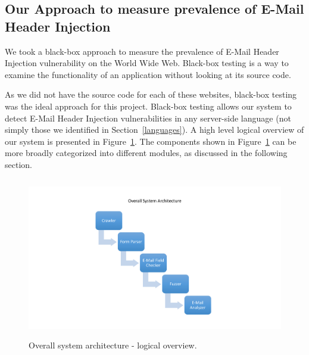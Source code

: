 \subsection[Approach]{Our Approach to measure prevalence of E-Mail Header Injection}
\label{sys:appr}
We took a black-box approach to measure the prevalence of E-Mail Header Injection vulnerability on the World Wide Web. Black-box testing \cite{wiki:Black-box_testing} is a way to examine the functionality of an application without looking at its source code.

As we did not have the source code for each of these websites, black-box testing was the ideal approach for this project. Black-box testing allows our system to detect E-Mail Header Injection vulnerabilities in any server-side language (not simply those we identified in Section~\ref{languages}). A high level logical overview of our system is presented in Figure~\ref{fig:overall}. The components shown in Figure~\ref{fig:overall} can be more broadly categorized into different modules, as discussed in the following section.

\begin{figure}
	\centering
	\includegraphics[width=14cm, height=7cm]{System/overall_design}
	\caption[]{Overall system architecture - logical overview.}
	\label{fig:overall}
\end{figure}
